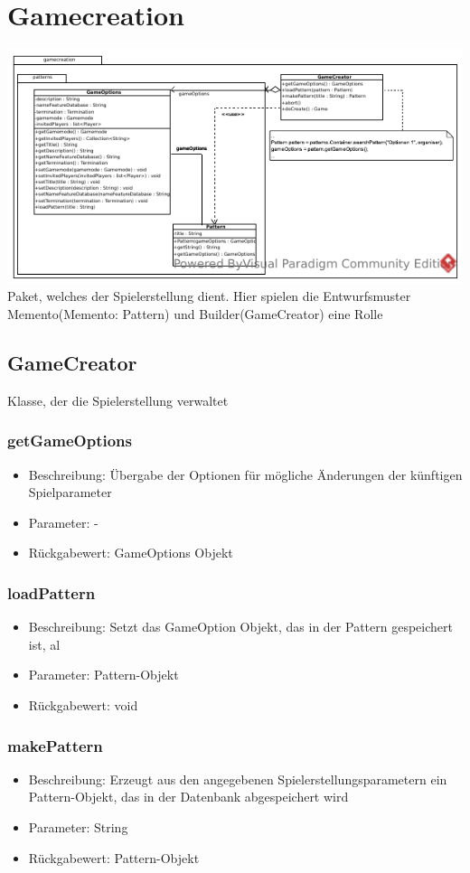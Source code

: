 \documentclass[a4paper]{scrreprt}
\begin{document}
	\section{Gamecreation}
	\includegraphics[width=\textwidth]{img/package/gamecreation.pdf}
	Paket, welches der Spielerstellung dient. Hier spielen die Entwurfsmuster Memento(Memento: Pattern) und Builder(GameCreator) eine Rolle
	\subsection{GameCreator}
	Klasse, der die Spielerstellung verwaltet
	\subsubsection{getGameOptions}
	\begin{itemize}
		\item Beschreibung: Übergabe der Optionen für mögliche Änderungen der künftigen Spielparameter
		\item Parameter: -
		\item Rückgabewert: GameOptions Objekt
	\end{itemize}
	\subsubsection{loadPattern}
	\begin{itemize}
		\item Beschreibung: Setzt das GameOption Objekt, das in der Pattern gespeichert ist, al
		\item Parameter: Pattern-Objekt
		\item Rückgabewert: void
	\end{itemize}
	\subsubsection{makePattern}
	\begin{itemize}
		\item Beschreibung: Erzeugt aus den angegebenen Spielerstellungsparametern ein Pattern-Objekt, das in der Datenbank abgespeichert wird
		\item Parameter: String
		\item Rückgabewert: Pattern-Objekt
	\end{itemize}
\end{document}

